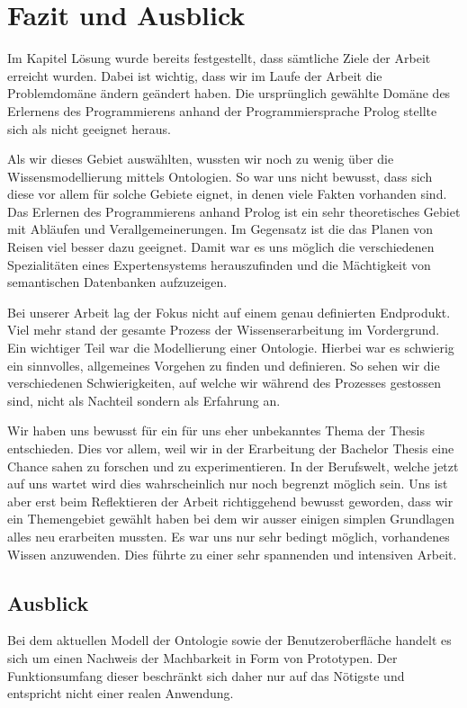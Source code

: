 \chapter{Fazit und Ausblick}
\label{chap:fazit}


Im Kapitel Lösung wurde bereits festgestellt, dass sämtliche Ziele der Arbeit erreicht wurden. Dabei ist wichtig, dass wir im Laufe der Arbeit die Problemdomäne ändern geändert haben. Die ursprünglich gewählte Domäne des Erlernens des Programmierens anhand der Programmiersprache Prolog stellte sich als nicht geeignet heraus.

Als wir dieses Gebiet auswählten, wussten wir noch zu wenig über die Wissensmodellierung mittels Ontologien. So war uns nicht bewusst, dass sich diese vor allem für solche Gebiete eignet, in denen viele Fakten vorhanden sind. Das Erlernen des Programmierens anhand Prolog ist ein sehr theoretisches Gebiet mit Abläufen und Verallgemeinerungen. Im Gegensatz ist die das Planen von Reisen viel besser dazu geeignet. Damit war es uns möglich die verschiedenen Spezialitäten eines Expertensystems herauszufinden und die Mächtigkeit von semantischen Datenbanken aufzuzeigen.

Bei unserer Arbeit lag der Fokus nicht auf einem genau definierten Endprodukt. Viel mehr stand der gesamte Prozess der Wissenserarbeitung im Vordergrund. Ein wichtiger Teil war die Modellierung einer Ontologie. Hierbei war es schwierig ein sinnvolles, allgemeines Vorgehen zu finden und definieren. So sehen wir die verschiedenen Schwierigkeiten, auf welche wir während des Prozesses gestossen sind, nicht als Nachteil sondern als Erfahrung an.

Wir haben uns bewusst für ein für uns eher unbekanntes Thema der Thesis entschieden. Dies vor allem, weil wir in der Erarbeitung der Bachelor Thesis eine Chance sahen zu forschen und zu experimentieren. In der Berufswelt, welche jetzt auf uns wartet wird dies wahrscheinlich nur noch begrenzt möglich sein. Uns ist aber erst beim Reflektieren der Arbeit richtiggehend bewusst geworden, dass wir ein Themengebiet gewählt haben bei dem wir ausser einigen simplen Grundlagen alles neu erarbeiten mussten. Es war uns nur sehr bedingt möglich, vorhandenes Wissen anzuwenden. Dies führte zu einer sehr spannenden und intensiven Arbeit.

\section{Ausblick}
\label{sec:fazit_subchap}
Bei dem aktuellen Modell der Ontologie sowie der Benutzeroberfläche handelt es sich um einen Nachweis der Machbarkeit in Form von Prototypen. Der Funktionsumfang dieser beschränkt sich daher nur auf das Nötigste und entspricht nicht einer realen Anwendung.

